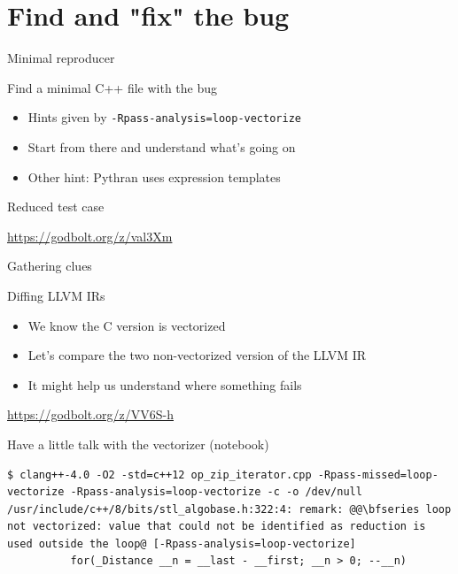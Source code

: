 \section{Find and "fix" the bug}

\begin{frame}{Minimal reproducer}
  \begin{block}{Find a minimal C++ file with the bug}
    \begin{itemize}
      \item Hints given by {\tt -Rpass-analysis=loop-vectorize}
      \item Start from there and understand what's going on
      \item Other hint: Pythran uses expression templates
    \end{itemize}
  \end{block}

  \begin{block}{Reduced test case}
    \begin{center}
      \url{https://godbolt.org/z/val3Xm}
    \end{center}
  \end{block}
\end{frame}

\begin{frame}[fragile]{Gathering clues}
  \begin{block}{Diffing LLVM IRs}
    \begin{itemize}
      \item We know the C version is vectorized
      \item Let's compare the two non-vectorized version of the LLVM IR
      \item It might help us understand where something fails
    \end{itemize}
    \begin{center}
      \url{https://godbolt.org/z/VV6S-h}
    \end{center}
  \end{block}

  \pause

  \begin{block}{Have a little talk with the vectorizer (notebook)}
    \begin{lstlisting}
$ clang++-4.0 -O2 -std=c++12 op_zip_iterator.cpp -Rpass-missed=loop-vectorize -Rpass-analysis=loop-vectorize -c -o /dev/null
/usr/include/c++/8/bits/stl_algobase.h:322:4: remark: @@\bfseries loop not vectorized: value that could not be identified as reduction is used outside the loop@ [-Rpass-analysis=loop-vectorize]
          for(_Distance __n = __last - __first; __n > 0; --__n)
    \end{lstlisting}
  \end{block}

\end{frame}


